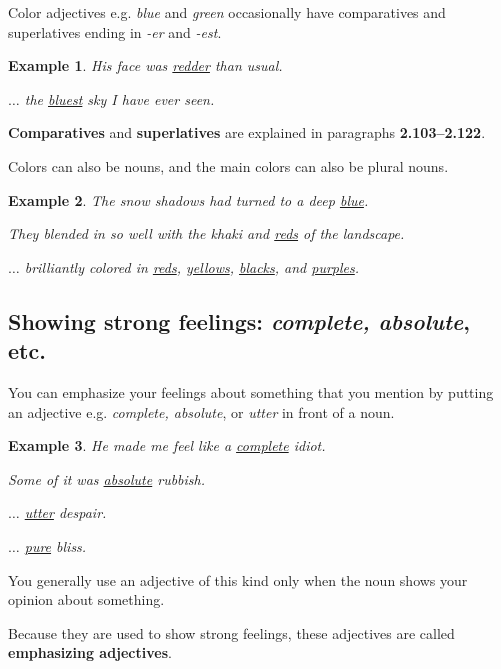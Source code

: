\documentclass[oneside]{book}
\numberwithin{equation}{section}
\newtheorem{example}{Example}[section]
\begin{document}
%
\noindent{} Color adjectives e.g. \textit{blue} and \textit{green} occasionally have comparatives and superlatives ending in \textit{-er} and \textit{-est}.
\begin{example}
    His face was \underline{redder} than usual.
    
    $\ldots$ the \underline{bluest} sky I have ever seen.
\end{example}
\textbf{Comparatives} and \textbf{superlatives} are explained in paragraphs \textbf{2.103--2.122}.

%
\noindent{} Colors can also be nouns, and the main colors can also be plural nouns.
\begin{example}
    The snow shadows had turned to a deep \underline{blue}.
    
    They blended in so well with the khaki and \underline{reds} of the landscape.
    
    $\ldots$ brilliantly colored in \underline{reds}, \underline{yellows}, \underline{blacks}, and \underline{purples}.
\end{example}

\subsection{Showing strong feelings: \textit{complete, absolute}, etc.}
\noindent{} You can emphasize your feelings about something that you mention by putting an adjective e.g. \textit{complete, absolute}, or \textit{utter} in front of a noun.
\begin{example}
    He made me feel like a \underline{complete} idiot.
    
    Some of it was \underline{absolute} rubbish.
    
    $\ldots$ \underline{utter} despair.
    
    $\ldots$ \underline{pure} bliss.
\end{example}
You generally use an adjective of this kind only when the noun shows your opinion about something.

%
Because they are used to show strong feelings, these adjectives are called \textbf{emphasizing adjectives}.
\end{document}
